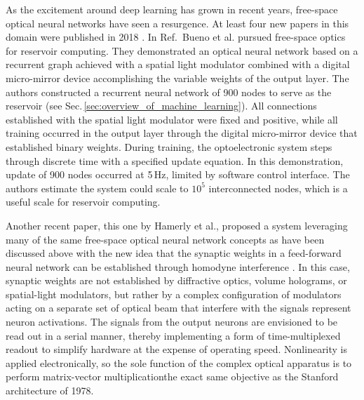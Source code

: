

As the excitement around deep learning has grown in recent years, free-space optical neural networks have seen a resurgence. At least four new papers in this domain were published in 2018 \cite{buma2018,hasl2018,liri2018,chsi2018}. In Ref.\,\cite{buma2018} Bueno et al. pursued free-space optics for reservoir computing. They demonstrated an optical neural network based on a recurrent graph achieved with a spatial light modulator combined with a digital micro-mirror device accomplishing the variable weights of the output layer. The authors constructed a recurrent neural network of 900 nodes to serve as the reservoir (see Sec.\,\ref{sec:overview_of_machine_learning}). All connections established with the spatial light modulator were fixed and positive, while all training occurred in the output layer through the digital micro-mirror device that established binary weights. During training, the optoelectronic system steps through discrete time with a specified update equation. In this demonstration, update of 900 nodes occurred at 5\,Hz, limited by software control interface. The authors estimate the system could scale to $10^5$ interconnected nodes, which is a useful scale for reservoir computing. 

Another recent paper, this one by Hamerly et al., proposed a system leveraging many of the same free-space optical neural network concepts as have been discussed above with the new idea that the synaptic weights in a feed-forward neural network can be established through homodyne interference \cite{hasl2018}. In this case, synaptic weights are not established by diffractive optics, volume holograms, or spatial-light modulators, but rather by a complex configuration of modulators acting on a separate set of optical beam that interfere with the signals represent neuron activations. The signals from the output neurons are envisioned to be read out in a serial manner, thereby implementing a form of time-multiplexed readout to simplify hardware at the expense of operating speed. Nonlinearity is applied electronically, so the sole function of the complex optical apparatus is to perform matrix-vector multiplication\textemdash the exact same objective as the Stanford architecture of 1978. 

